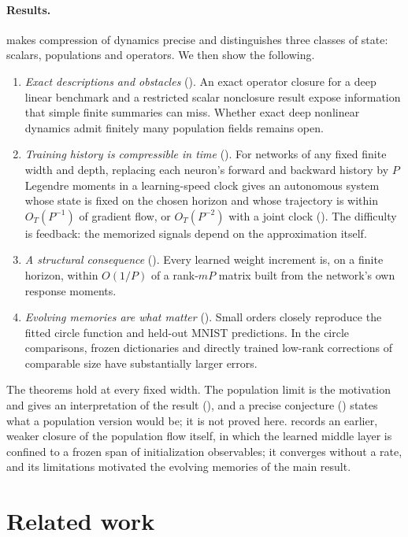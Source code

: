 \documentclass[11pt]{article}
\theoremstyle{definition}
\theoremstyle{remark}
\begin{document}
\paragraph{Results.}
 makes compression of dynamics precise and distinguishes three
classes of state: scalars, populations and operators.  We then show the
following.
\begin{enumerate}
\item \emph{Exact descriptions and obstacles} ().  An exact
operator closure for a deep linear benchmark and a restricted scalar
nonclosure result expose information that simple finite summaries can miss.
Whether exact deep nonlinear dynamics admit finitely many population fields
remains open.
\item \emph{Training history is compressible in time} ().  For
networks of any fixed finite width and depth, replacing each neuron's forward and backward history by
$P$ Legendre moments in a learning-speed clock gives an autonomous system whose
state is fixed on the chosen horizon and whose trajectory is within
$O_T(P^{-1})$ of gradient flow, or $O_T(P^{-2})$ with a joint clock
().  The difficulty is feedback: the memorized signals
depend on the approximation itself.
\item \emph{A structural consequence} ().  Every learned weight
increment is, on a finite horizon, within $O(1/P)$ of a rank-$mP$ matrix built
from the network's own response moments.
\item \emph{Evolving memories are what matter} ().  Small
orders closely reproduce the fitted circle function and held-out MNIST
predictions.  In the circle comparisons, frozen dictionaries and directly
trained low-rank corrections of comparable size have substantially larger errors.
\end{enumerate}
The theorems hold at every fixed width.  The population limit is the motivation
and gives an interpretation of the result (), and a
precise conjecture () states what a population version
would be; it is not proved here.   records an earlier,
weaker closure of the population flow itself, in which the learned middle layer
is confined to a frozen span of initialization observables; it converges without
a rate, and its limitations motivated the evolving memories of the main result.

\section{Related work}
\label{sec:related}
\end{document}

